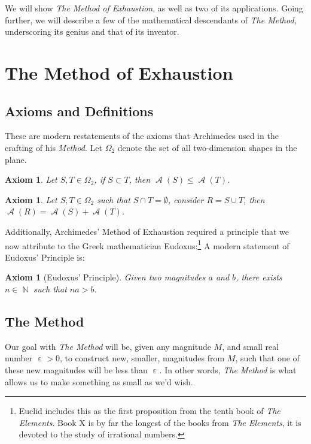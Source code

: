 \documentclass[letterpaper, 12pt]{amsart}
\DeclareMathOperator{\N}{\mathbb{N}}
\DeclareMathOperator{\A}{\mathcal{A}}
\DeclareMathOperator{\ep}{\varepsilon}
\newtheorem{axe}[thm]{Axiom}
\theoremstyle{definition}  %
\begin{document}
	We will show \textit{The Method of Exhaustion}, as well as two of its applications.
	Going further, we will describe a few of the mathematical descendants of \textit{The Method}, underscoring its genius and that of its inventor.

	\section{The Method of Exhaustion}
	\label{sec:the_method_of_exhaustion}
		\subsection{Axioms and Definitions}
		\label{sub:axioms_and_definitions}
		These are modern restatements of the axioms that Archimedes used in the crafting of his \textit{Method}.
		Let $\Omega_{2}$ denote the set of all two-dimension shapes in the plane.

		\begin{axe}
		Let $S,T \in \Omega_{2}$, if $S \subset T$, then $\A(S) \leq \A(T)$.
		\end{axe}

		\begin{axe}
		Let $S,T \in \Omega_{2}$ such that $S \cap T = \emptyset$, consider $R = S \cup T$, then $\A(R) = \A(S) + \A(T)$.
		\end{axe}

		Additionally, Archimedes' Method of Exhaustion required a principle that we now attribute to the Greek mathematician Eudoxus:\footnote{Euclid includes this as the first proposition from the tenth book of \textit{The Elements}. Book X is by far the longest of the books from \textit{The Elements}, it is devoted to the study of irrational numbers.}
		A modern statement of Eudoxus' Principle is:
		\begin{axe}[Eudoxus' Principle]
		\label{axe:eudoxus}
		Given two magnitudes $a$ and $b$, there exists $n \in \N$ such that $na>b$.
		\end{axe}		

		\subsection{The Method}
		\label{sub:the_method}
		Our goal with \textit{The Method} will be, given any magnitude $M$, and small real number $\ep > 0$, to construct new, smaller, magnitudes from $M$, such that one of these new magnitudes will be less than $\ep$.
		In other words, \textit{The Method} is what allows us to make something as small as we'd wish.
\end{document}
